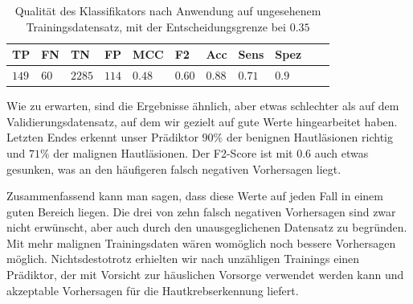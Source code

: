 \begin{table}[htb!]
\begin{center}
\begin{tabular}{lllllllllll}
	\toprule
 	TP & FN & TN & FP & MCC & F2 & Acc & Sens & Spez\\
	\midrule
    $149$&	$60$ &	$2285$ &	$114$ &	$0.48$ 	&$0.60$	&$0.88$	&$0.71$&	$0.9$ \\
 \bottomrule
 \end{tabular}
 \end{center}
  \caption{Qualität des Klassifikators nach Anwendung auf ungesehenem Trainingsdatensatz, mit der Entscheidungsgrenze bei $0.35$}
 \label{tab:test_scores}
 \end{table}

 Wie zu erwarten, sind die Ergebnisse ähnlich, aber etwas schlechter als auf dem Validierungsdatensatz, auf dem wir gezielt auf gute Werte hingearbeitet haben. Letzten Endes erkennt unser Prädiktor $90\%$ der benignen Hautläsionen richtig und $71\%$ der malignen Hautläsionen. Der F2-Score ist mit $0.6$ auch etwas gesunken, was an den häufigeren falsch negativen Vorhersagen liegt.

Zusammenfassend kann man sagen, dass diese Werte auf jeden Fall in einem guten Bereich liegen. Die drei von zehn falsch negativen Vorhersagen sind zwar nicht erwünscht, aber auch durch den unausgeglichenen Datensatz zu begründen. Mit mehr malignen Trainingsdaten wären womöglich noch bessere Vorhersagen möglich. Nichtsdestotrotz erhielten wir nach unzähligen Trainings einen Prädiktor, der mit Vorsicht zur häuslichen Vorsorge verwendet werden kann und akzeptable Vorhersagen für die Hautkrebserkennung liefert.


